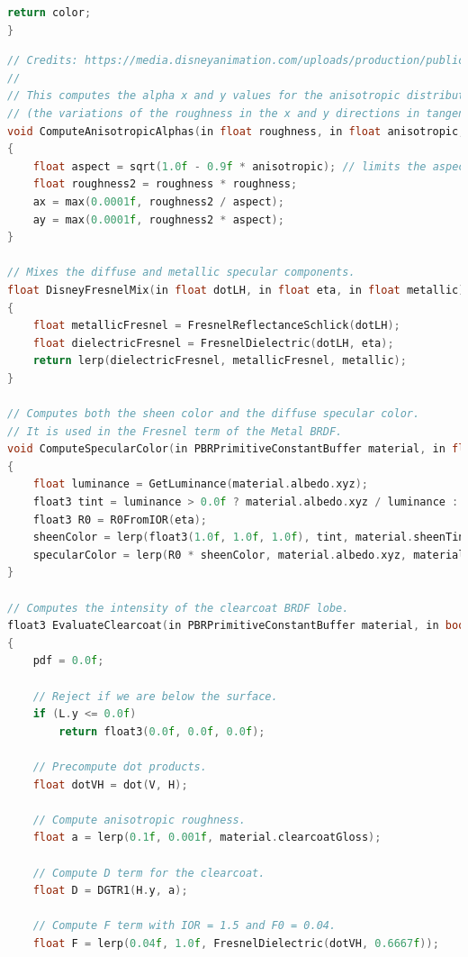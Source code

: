 \documentclass[12pt,a4paper]{report}
\numberwithin{equation}{section} %
\begin{document}
\begin{appendices}
\begin{lstlisting}[caption={Algoritmul Path Tracing},label={lst:pathtracing},language=C++,escapechar=\$]
	return color;
}
\end{lstlisting}
\begin{lstlisting}[caption={Evaluarea și eșantionarea BSDF-ului Disney},label={lst:bsdf},language=C++,escapechar=\$]
// Credits: https://media.disneyanimation.com/uploads/production/publication_asset/48/asset/s2012_pbs_disney_brdf_notes_v3.pdf
//
// This computes the alpha x and y values for the anisotropic distribution of GTR2.
// (the variations of the roughness in the x and y directions in tangent space).
void ComputeAnisotropicAlphas(in float roughness, in float anisotropic, out float ax, out float ay)
{
	float aspect = sqrt(1.0f - 0.9f * anisotropic); // limits the aspect ratio to 10:1
	float roughness2 = roughness * roughness;
	ax = max(0.0001f, roughness2 / aspect);
	ay = max(0.0001f, roughness2 * aspect);
}

// Mixes the diffuse and metallic specular components.
float DisneyFresnelMix(in float dotLH, in float eta, in float metallic)
{
	float metallicFresnel = FresnelReflectanceSchlick(dotLH);
	float dielectricFresnel = FresnelDielectric(dotLH, eta);
	return lerp(dielectricFresnel, metallicFresnel, metallic);
}

// Computes both the sheen color and the diffuse specular color.
// It is used in the Fresnel term of the Metal BRDF.
void ComputeSpecularColor(in PBRPrimitiveConstantBuffer material, in float eta, out float3 specularColor, out float3 sheenColor)
{
	float luminance = GetLuminance(material.albedo.xyz);
	float3 tint = luminance > 0.0f ? material.albedo.xyz / luminance : float3(1.0f, 1.0f, 1.0f);
	float3 R0 = R0FromIOR(eta);
	sheenColor = lerp(float3(1.0f, 1.0f, 1.0f), tint, material.sheenTint);
	specularColor = lerp(R0 * sheenColor, material.albedo.xyz, material.metallic);
}

// Computes the intensity of the clearcoat BRDF lobe.
float3 EvaluateClearcoat(in PBRPrimitiveConstantBuffer material, in bool anisotropic, in float3 V, in float3 L, in float3 H, out float pdf)
{
	pdf = 0.0f;

	// Reject if we are below the surface.
	if (L.y <= 0.0f)
		return float3(0.0f, 0.0f, 0.0f);

	// Precompute dot products.
	float dotVH = dot(V, H);

	// Compute anisotropic roughness.
	float a = lerp(0.1f, 0.001f, material.clearcoatGloss);

	// Compute D term for the clearcoat.
	float D = DGTR1(H.y, a);

	// Compute F term with IOR = 1.5 and F0 = 0.04.
	float F = lerp(0.04f, 1.0f, FresnelDielectric(dotVH, 0.6667f));


\end{lstlisting}
\end{appendices}
\end{document}
